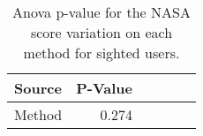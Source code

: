 
\begin{table}[!htb]
\centering
\caption{Anova p-value for the NASA score variation on each method for sighted users.}
\label{tab:blocanova_nasa_var_sight}
\begin{tabular}{lrrrrr}
\toprule
Source & P-Value \\
\midrule
Method &   0.274 \\
\bottomrule
\end{tabular}
\end{table}

